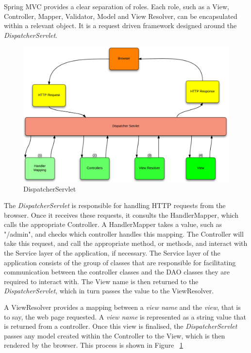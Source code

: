 Spring MVC provides a clear separation of roles. Each role, such as a View, Controller, Mapper, Validator, Model and View Resolver, can be encapsulated within a relevant object. It is a request driven framework designed around the \textit{DispatcherServlet}. 

\begin{figure}[H]
\begin{center}
\includegraphics[width=14cm]{dispatchservlet.png}
\end{center}
\caption{DispatcherServlet}
\label{fig:dispatcherflow}
\end{figure}

The \textit{DispatcherServlet} is responsible for handling HTTP requests from the browser. Once it receives these requests, it consults the HandlerMapper, which calls the appropriate Controller. A HandlerMapper takes a value, such as "/admin", and checks which controller handles this mapping. The Controller will take this request, and call the appropriate method, or methods, and interact with the Service layer of the application, if necessary. The Service layer of the application consists of the group of classes that are responsible for facilitating communication between the controller classes and the DAO classes they are required to interact with. The View name is then returned to the \textit{DispatcherServlet}, which in turn passes the value to the ViewResolver. 

A ViewResolver provides a mapping between a \textit{view name} and the \textit{view}, that is to say, the web page requested. A \textit{view name} is represented as a string value that is returned from a controller. Once this view is finalised, the \textit{DispatcherServlet} passes any model created within the Controller to the View, which is then rendered by the browser. This process is shown in Figure ~\ref{fig:dispatcherflow}


